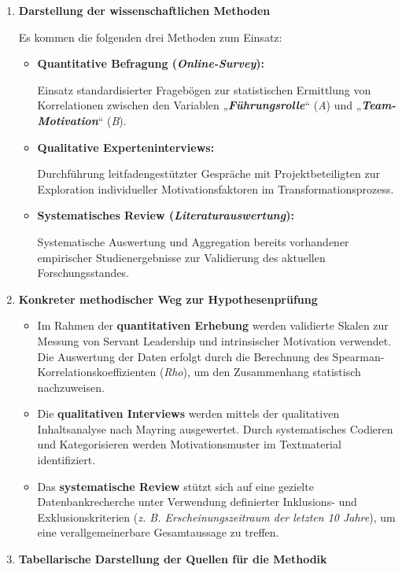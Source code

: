 \begin{enumerate}[label=\thechapter.\arabic*), leftmargin=*]
    \item \textbf{Darstellung der wissenschaftlichen Methoden} \par Es kommen die folgenden drei Methoden zum Einsatz:
    \begin{itemize}
        \item \textbf{Quantitative Befragung (\textit{Online-Survey}):} \par Einsatz standardisierter Fragebögen zur statistischen Ermittlung von Korrelationen zwischen den Variablen „\textbf{\textit{Führungsrolle}}“ (\textit{A}) und „\textbf{\textit{Team-Motivation}}“ (\textit{B}).
        \item \textbf{Qualitative Experteninterviews:} \par Durchführung leitfadengestützter Gespräche mit Projektbeteiligten zur Exploration individueller Motivationsfaktoren im Transformationsprozess.
        \item \textbf{Systematisches Review (\textit{Literaturauswertung}):} \par Systematische Auswertung und Aggregation bereits vorhandener empirischer Studienergebnisse zur Validierung des aktuellen Forschungsstandes.
    \end{itemize}
    \item \textbf{Konkreter methodischer Weg zur Hypothesenprüfung}
        \begin{itemize}
            \item Im Rahmen der \textbf{quantitativen Erhebung} werden validierte Skalen zur Messung von Servant Leadership und intrinsischer Motivation verwendet. Die Auswertung der Daten erfolgt durch die Berechnung des Spearman-Korrelationskoeffizienten (\textit{\acs{Rho}}), um den Zusammenhang statistisch nachzuweisen.
            \item Die \textbf{qualitativen Interviews} werden mittels der qualitativen Inhaltsanalyse nach Mayring ausgewertet. Durch systematisches Codieren und Kategorisieren werden Motivationsmuster im Textmaterial identifiziert.
            \item Das \textbf{systematische Review} stützt sich auf eine gezielte Datenbankrecherche unter Verwendung definierter Inklusions- und Exklusionskriterien (\textit{\acs{z. B.} Erscheinungszeitraum der letzten 10 Jahre}), um eine verallgemeinerbare Gesamtaussage zu treffen.
        \end{itemize}
    \cleardoublepage
    \item \textbf{Tabellarische Darstellung der Quellen für die Methodik}

\end{enumerate}
